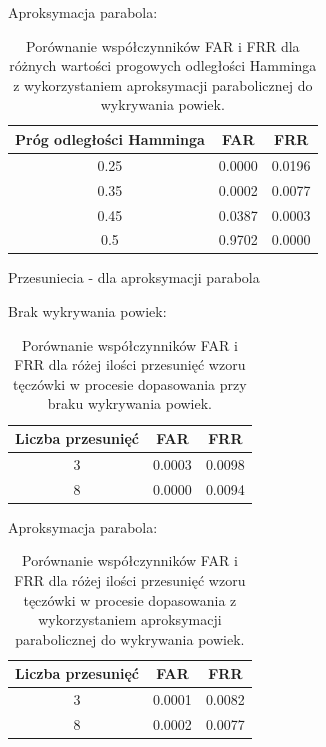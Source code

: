 Aproksymacja parabola:

\begin{table}[ht]
  \centering
  \begin{tabular}{c|c|c}
    \rowcolor{gray!20}
    Próg odległości Hamminga & FAR & FRR \\
    \hline\hline
    0.25 & 0.0000 & 0.0196 \\
    \hline
    0.35 & 0.0002 & 0.0077 \\
    \hline
    0.45 & 0.0387 & 0.0003 \\
    \hline
    0.5 & 0.9702 & 0.0000 \\
  \end{tabular}
  \caption{Porównanie współczynników FAR i FRR dla różnych wartości progowych odległości Hamminga
  z wykorzystaniem aproksymacji parabolicznej do wykrywania powiek.}
\end{table}

Przesuniecia - dla aproksymacji parabola

Brak wykrywania powiek:

\begin{table}[ht]
  \centering
  \begin{tabular}{c|c|c}
    \rowcolor{gray!20}
    Liczba przesunię\'c & FAR & FRR \\
    \hline\hline
    3 & 0.0003 & 0.0098 \\
    \hline
    8 & 0.0000 & 0.0094 \\
  \end{tabular}
  \caption{Porównanie współczynników FAR i FRR dla różej ilości przesunię\'c wzoru tęczówki w procesie dopasowania
  przy braku wykrywania powiek.}
\end{table}

Aproksymacja parabola:

\begin{table}[ht]
  \centering
  \begin{tabular}{c|c|c}
    \rowcolor{gray!20}
    Liczba przesunię\'c & FAR & FRR \\
    \hline\hline
    3 & 0.0001 & 0.0082 \\
    \hline
    8 & 0.0002 & 0.0077 \\
  \end{tabular}
  \caption{Porównanie współczynników FAR i FRR dla różej ilości przesunię\'c wzoru tęczówki w procesie dopasowania
  z wykorzystaniem aproksymacji parabolicznej do wykrywania powiek.}
\end{table}

